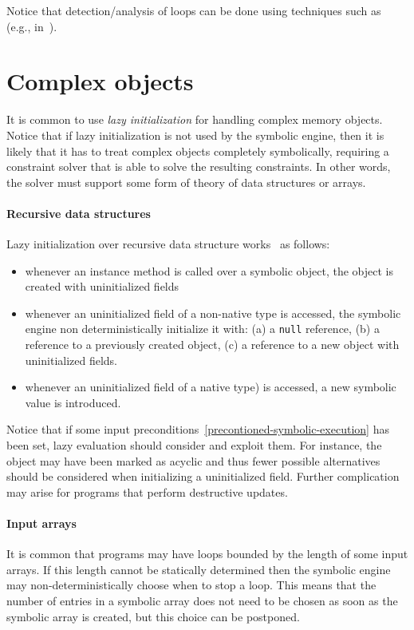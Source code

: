 Notice that detection/analysis of loops can be done using techniques such as~\cite{SGL-TOPLAS96} (e.g., in~\cite{CFB-ACSAC06}).


\section{Complex objects}

It is common to use {\em lazy initialization} for handling complex memory objects. Notice that if lazy initialization is not used by the symbolic engine, then it is likely that it has to treat complex objects completely symbolically, requiring a constraint solver that is able to solve the resulting constraints. In other words, the solver must support some form of theory of data structures or arrays.

\paragraph{Recursive data structures} Lazy initialization over recursive data structure works~\cite{PV-JSTTT09} as follows:
\begin{itemize}
  \item whenever an instance method is called over a symbolic object, the object is created with uninitialized fields
  \item whenever an uninitialized field of a non-native type is accessed, the symbolic engine non deterministically initialize it with: (a) a {\tt null} reference, (b) a reference to a previously created object, (c) a reference to a new object with uninitialized fields. 
  \item whenever an uninitialized field of a native type) is accessed, a new symbolic value is introduced. 
\end{itemize}


Notice that if some input preconditions~\ref{precontioned-symbolic-execution} has been set, lazy evaluation should consider and exploit them. For instance, the object may have been marked as acyclic and thus fewer possible alternatives should be considered when initializing a uninitialized field. Further complication~\cite{PV-JSTTT09} may arise for programs that perform destructive updates. 

\paragraph{Input arrays}
It is common that programs may have loops bounded by the length of some input arrays. If this length cannot be statically determined then the symbolic engine may non-deterministically choose when to stop a loop. This means that the number of entries in a symbolic array does not need to be chosen as soon as the symbolic array is created, but this choice can be postponed.

